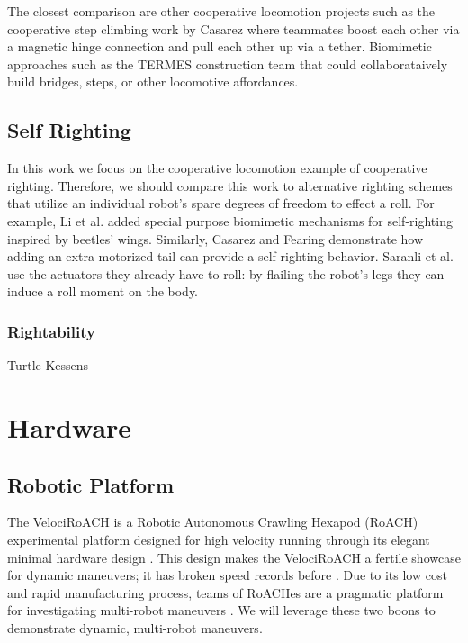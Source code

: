 \documentclass[letterpaper]{report}
\begin{document}
The closest comparison are other cooperative locomotion projects such as the cooperative step climbing work by Casarez \cite{casarez2016step} where teammates boost each other via a magnetic hinge connection and pull each other up via a tether.
Biomimetic approaches such as the TERMES \cite{werfel2014designing} construction team that could collaborataively build bridges, steps, or other locomotive affordances.

\subsection{Self Righting}
In this work we focus on the cooperative locomotion example of cooperative righting.
Therefore, we should compare this work to alternative righting schemes that utilize an individual robot's spare degrees of freedom to effect a roll.
For example, Li et al. \cite{li2016cockroach} added special purpose biomimetic mechanisms for self-righting inspired by beetles' wings.
Similarly, Casarez and Fearing \cite{casarezTailRighting} demonstrate how adding an extra motorized tail can provide a self-righting behavior.
Saranli et al. \cite{saranli2004model} use the actuators they already have to roll: by flailing the robot's legs they can induce a roll moment on the body.

\subsubsection{Rightability}
Turtle \cite{domokos2008geometry}
Kessens \cite{kessens2012framework,kessens2014metric}

\section{Hardware}

\subsection{Robotic Platform}
The VelociRoACH is a Robotic Autonomous Crawling Hexapod (RoACH) experimental platform designed for high velocity running through its elegant minimal hardware design \cite{haldaneVelociRoACHDesign}.
This design makes the VelociRoACH a fertile showcase for dynamic maneuvers; it has broken speed records before \cite{haldane2015running}.
Due to its low cost and rapid manufacturing process, teams of RoACHes are a pragmatic platform for investigating multi-robot maneuvers \cite{casarez2016step}.
We will leverage these two boons to demonstrate dynamic, multi-robot maneuvers.
\end{document}
